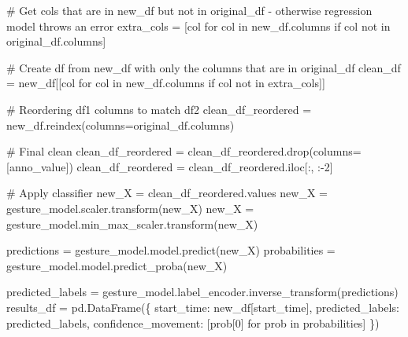 \documentclass[
  letterpaper,
  DIV=11,
  numbers=noendperiod]{scrreprt}
\newenvironment{Shaded}{\begin{snugshade}}{\end{snugshade}}
\newcommand{\CommentTok}[1]{\textcolor[rgb]{0.37,0.37,0.37}{#1}}
\newcommand{\ControlFlowTok}[1]{\textcolor[rgb]{0.00,0.23,0.31}{#1}}
\newcommand{\DecValTok}[1]{\textcolor[rgb]{0.68,0.00,0.00}{#1}}
\newcommand{\KeywordTok}[1]{\textcolor[rgb]{0.00,0.23,0.31}{#1}}
\newcommand{\NormalTok}[1]{\textcolor[rgb]{0.00,0.23,0.31}{#1}}
\newcommand{\OperatorTok}[1]{\textcolor[rgb]{0.37,0.37,0.37}{#1}}
\newcommand{\StringTok}[1]{\textcolor[rgb]{0.13,0.47,0.30}{#1}}
\begin{document}
\begin{Shaded}
\begin{Highlighting}[]
                \CommentTok{\# Get cols that are in new\_df but not in original\_df {-} otherwise regression model throws an error}
\NormalTok{                extra\_cols }\OperatorTok{=}\NormalTok{ [col }\ControlFlowTok{for}\NormalTok{ col }\KeywordTok{in}\NormalTok{ new\_df.columns }\ControlFlowTok{if}\NormalTok{ col }\KeywordTok{not} \KeywordTok{in}\NormalTok{ original\_df.columns]}

                \CommentTok{\# Create df from new\_df with only the columns that are in original\_df}
\NormalTok{                clean\_df }\OperatorTok{=}\NormalTok{ new\_df[[col }\ControlFlowTok{for}\NormalTok{ col }\KeywordTok{in}\NormalTok{ new\_df.columns }\ControlFlowTok{if}\NormalTok{ col }\KeywordTok{not} \KeywordTok{in}\NormalTok{ extra\_cols]]}

                \CommentTok{\# Reordering df1 columns to match df2}
\NormalTok{                clean\_df\_reordered }\OperatorTok{=}\NormalTok{ new\_df.reindex(columns}\OperatorTok{=}\NormalTok{original\_df.columns)}

                \CommentTok{\# Final clean}
\NormalTok{                clean\_df\_reordered }\OperatorTok{=}\NormalTok{ clean\_df\_reordered.drop(columns}\OperatorTok{=}\NormalTok{[}\StringTok{\textquotesingle{}anno\_value\textquotesingle{}}\NormalTok{])}
\NormalTok{                clean\_df\_reordered }\OperatorTok{=}\NormalTok{ clean\_df\_reordered.iloc[:, :}\OperatorTok{{-}}\DecValTok{2}\NormalTok{]}

                \CommentTok{\# Apply classifier}
\NormalTok{                new\_X }\OperatorTok{=}\NormalTok{ clean\_df\_reordered.values}
\NormalTok{                new\_X }\OperatorTok{=}\NormalTok{ gesture\_model.scaler.transform(new\_X)}
\NormalTok{                new\_X }\OperatorTok{=}\NormalTok{ gesture\_model.min\_max\_scaler.transform(new\_X)}

\NormalTok{                predictions }\OperatorTok{=}\NormalTok{ gesture\_model.model.predict(new\_X)}
\NormalTok{                probabilities }\OperatorTok{=}\NormalTok{ gesture\_model.model.predict\_proba(new\_X)}

\NormalTok{                predicted\_labels }\OperatorTok{=}\NormalTok{ gesture\_model.label\_encoder.inverse\_transform(predictions)}
\NormalTok{                results\_df }\OperatorTok{=}\NormalTok{ pd.DataFrame(\{}
                    \StringTok{\textquotesingle{}start\_time\textquotesingle{}}\NormalTok{: new\_df[}\StringTok{\textquotesingle{}start\_time\textquotesingle{}}\NormalTok{],}
                    \StringTok{\textquotesingle{}predicted\_labels\textquotesingle{}}\NormalTok{: predicted\_labels,}
                    \StringTok{\textquotesingle{}confidence\_movement\textquotesingle{}}\NormalTok{: [prob[}\DecValTok{0}\NormalTok{] }\ControlFlowTok{for}\NormalTok{ prob }\KeywordTok{in}\NormalTok{ probabilities]}
\NormalTok{                \})}


\end{Highlighting}
\end{Shaded}
\end{document}
